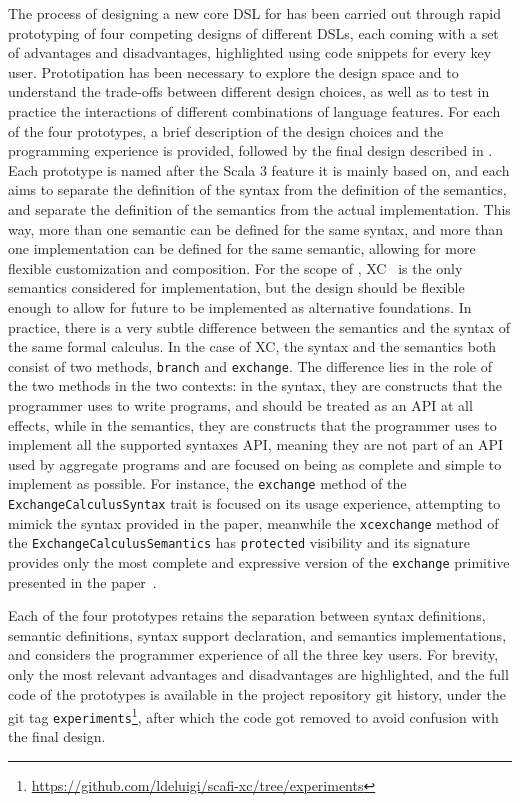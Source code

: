 The process of designing a new core \ac{DSL} for \this has been carried out through rapid prototyping of four competing designs of different \acp{DSL}, each coming with a set of advantages and disadvantages, highlighted using code snippets for every key user.
%
Prototipation has been necessary to explore the design space and to understand the trade-offs between different design choices, as well as to test in practice the interactions of different combinations of language features.
%
For each of the four prototypes, a brief description of the design choices and the programming experience is provided, followed by the final design described in .
%
Each prototype is named after the Scala 3 feature it is mainly based on, and each aims to separate the definition of the syntax from the definition of the semantics, and separate the definition of the semantics from the actual implementation.
%
This way, more than one semantic can be defined for the same syntax, and more than one implementation can be defined for the same semantic, allowing for more flexible customization and composition.
%
For the scope of \this, \ac{XC}~\cite{xc} is the only semantics considered for implementation, but the design should be flexible enough to allow for future  to be implemented as alternative foundations.
%
In practice, there is a very subtle difference between the semantics and the syntax of the same formal calculus.
%
In the case of \ac{XC}, the syntax and the semantics both consist of two methods, \texttt{branch} and \texttt{exchange}.
%
The difference lies in the role of the two methods in the two contexts: in the syntax, they are constructs that the programmer uses to write programs, and should be treated as an \ac{API} at all effects, while in the semantics, they are constructs that the programmer uses to implement all the supported syntaxes \ac{API}, meaning they are not part of an \ac{API} used by aggregate programs and are focused on being as complete and simple to implement as possible.
%
For instance, the \texttt{exchange} method of the \texttt{ExchangeCalculusSyntax} trait is focused on its usage experience, attempting to mimick the syntax provided in the paper, meanwhile the \texttt{xcexchange} method of the \texttt{ExchangeCalculusSemantics} has \texttt{protected} visibility and its signature provides only the most complete and expressive version of the \texttt{exchange} primitive presented in the paper~\cite{xc}.

Each of the four prototypes retains the separation between syntax definitions, semantic definitions, syntax support declaration, and semantics implementations, and considers the programmer experience of all the three key users.
%
For brevity, only the most relevant advantages and disadvantages are highlighted, and the full code of the prototypes is available in the project repository git history, under the git tag \texttt{experiments}\footnote{\url{https://github.com/ldeluigi/scafi-xc/tree/experiments}}, after which the code got removed to avoid confusion with the final design.


